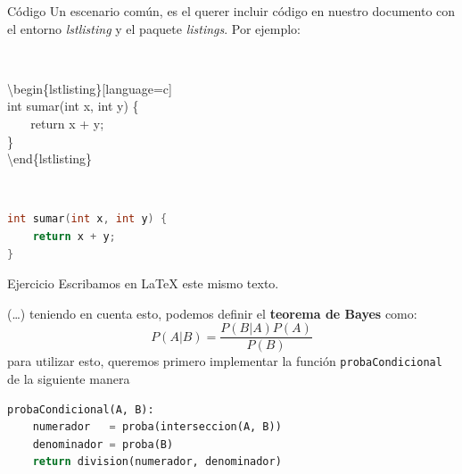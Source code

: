 \begin{frame}[fragile]{Código}
Un escenario común, es el querer incluir código en nuestro documento con el \textcolor{codeorange}{entorno} \emph{lstlisting} y el \textcolor{codeorange}{paquete} \emph{listings}. Por ejemplo:

\

\textbackslash begin\{lstlisting\}[language=c] \\
int sumar(int x, int y) \{ \\
$~~~~~~~$ return x + y; \\
\} \\
\textbackslash end\{lstlisting\}

\

\begin{lstlisting}[language=c]
int sumar(int x, int y) {
    return x + y;
}
\end{lstlisting}

\end{frame}

\begin{frame}[fragile]{Ejercicio}
    Escribamos en \LaTeX{}  este mismo texto. 
    
    \begin{tcolorbox}[colframe=color1]
        (\ldots) teniendo en cuenta esto, podemos definir el \textbf{teorema de Bayes} como:
        \[P(A|B) = \frac{P(B|A)P(A)}{P(B)}\]
        para utilizar esto, queremos primero implementar la función \texttt{probaCondicional} de la siguiente manera
\begin{lstlisting}[language=python]
probaCondicional(A, B):
    numerador   = proba(interseccion(A, B))
    denominador = proba(B)       
    return division(numerador, denominador)
\end{lstlisting}
\end{tcolorbox}
    
\end{frame}

